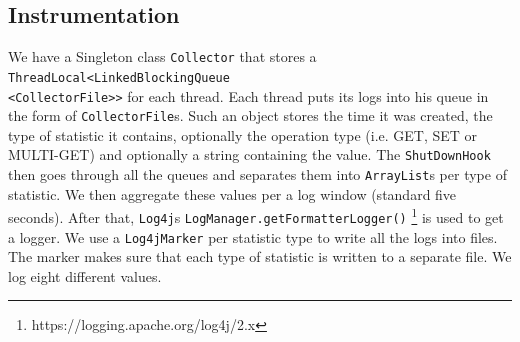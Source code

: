 \documentclass[11pt,a4paper]{article}
\newcommand{\co}[1]{\texttt{#1}}
\begin{document}
\subsection{Instrumentation}
We have a Singleton class \co{Collector} that stores a \co{ThreadLocal<LinkedBlockingQueue\\<CollectorFile>>} for each thread. Each thread puts its logs into his queue in the form of \co{CollectorFile}s. Such an object stores the time it was created, the type of statistic it contains, optionally the operation type (i.e. GET, SET or MULTI-GET) and optionally a string containing the value. The \co{ShutDownHook} then goes through all the queues and separates them into \co{ArrayList}s per type of statistic. We then aggregate these values per a log window (standard five seconds). After that, \co{Log4j}s \co{LogManager.getFormatterLogger()} \footnote{https://logging.apache.org/log4j/2.x} is used to get a logger. We use a \co{Log4jMarker} per statistic type to write all the logs into files. The marker makes sure that each type of statistic is written to a separate file. We log eight different values.
\end{document}
